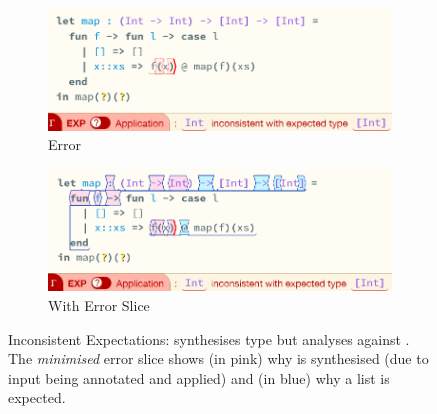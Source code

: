 \begin{figure}[h]
\centering
\begin{subfigure}{0.49\textwidth}
\centering
\includegraphics[width=1\textwidth]{Media/Figures/map_example}
\caption{Error}
\end{subfigure}
\begin{subfigure}{0.49\textwidth}
\centering
\includegraphics[width=1\textwidth]{Media/Figures/map_example_sliced}
\caption{With Error Slice}
\end{subfigure}
\caption{Inconsistent Expectations:  synthesises type  but analyses against \code{[Int]}. The \textit{minimised} error slice shows (in pink) why  is synthesised (due to input  being annotated  and applied) and (in blue) why a list is expected.}
\label{fig:MapExample}
\end{figure}
